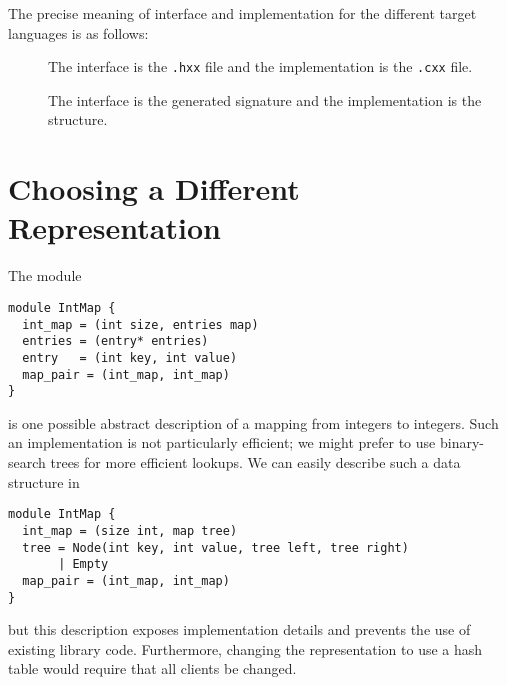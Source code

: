 The precise meaning of interface and implementation for the different
target languages is as follows:
\begin{description}
  \item[\Cplusplus{}]
    The interface is the \texttt{.hxx} file and the implementation is the \texttt{.cxx}
    file.
  \item[\sml{}]
    The interface is the generated signature and the implementation is the structure.
\end{description}%

\section{Choosing a Different Representation}

The \asdl{} module
\begin{code}\begin{lstlisting}[language=ASDL]
module IntMap {
  int_map = (int size, entries map)
  entries = (entry* entries)
  entry   = (int key, int value)
  map_pair = (int_map, int_map)
}
\end{lstlisting}\end{code}%
is one possible abstract description of a mapping from integers to
integers.
Such an implementation is not particularly efficient; we might prefer to
use binary-search trees for more efficient lookups.
We can easily describe such a data structure in \asdl{}
\begin{code}\begin{lstlisting}[language=ASDL]
module IntMap {
  int_map = (size int, map tree)
  tree = Node(int key, int value, tree left, tree right)
       | Empty
  map_pair = (int_map, int_map)
}
\end{lstlisting}\end{code}%
but this description exposes implementation details and prevents the use
of existing library code.  Furthermore, changing the representation
to use a hash table would require that all clients be changed.

